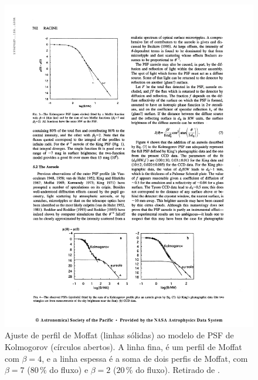 \begin{figure}
	\includegraphics{figuras/PSFRacine}
	\caption[Ajuste de perfil de Moffat ao modelo de PSF de Kolmogorov]
	{Ajuste de perfil de Moffat (linhas sólidas) ao modelo de PSF de Kolmogorov
	(círculos abertos). A linha fina, é um perfil de Moffat com $\beta\!=\!4$, e a
	linha espessa é a soma de dois perfis de Moffat, com $\beta\!=\!7$ ($80\,\%$
	do fluxo) e $\beta\!=\!2$ ($20\,\%$ do fluxo). Retirado de \citet{Racine1996}.}
	\label{fig:PSFRacine}
\end{figure}

